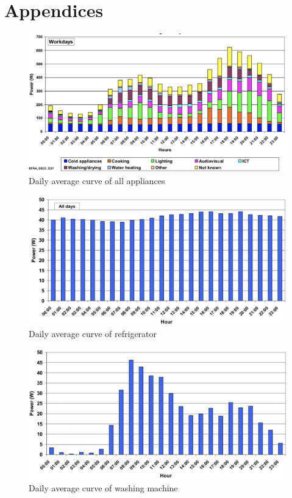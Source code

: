 \documentclass[12pt,a4paper]{report}
\begin{document}
    \chapter*{Appendices}
    \label{text_appendices}
    \pagestyle{plain}
    \begin{figure}[ht]
        \centerline{\includegraphics[scale=1.4]{allapp}}
        \caption{Daily average curve of all appliances}
        \label{fig_all_app}
    \end{figure}
    \begin{figure}[ht]
        \centerline{\includegraphics[scale=1]{chestfreezer}}
        \caption{Daily average curve of refrigerator}
        \label{fig_refrigerator}
    \end{figure}
    \begin{figure}[ht]
        \centerline{\includegraphics[scale=1]{washingmachine}}
        \caption{Daily average curve of washing machine}
        \label{fig_washing_machine}
    \end{figure}
\end{document}
